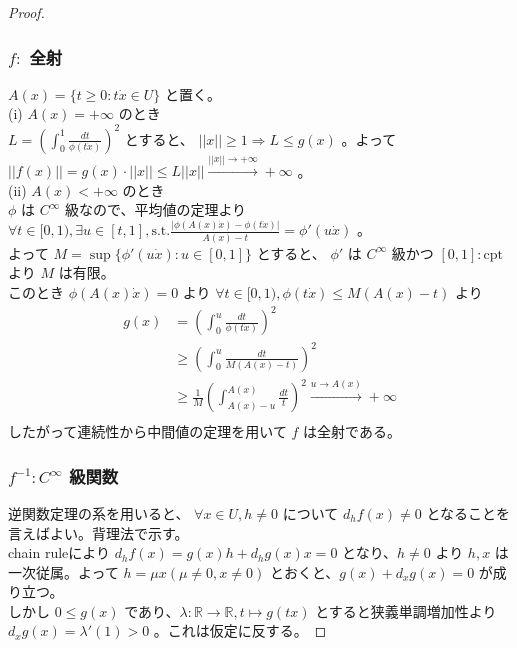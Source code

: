\documentclass[a4paper,10pt]{jsarticle}
\begin{document}
\begin{proof}
  \subsubsection*{$f:$ 全射}
  $A(x)=\{t \geq 0: t\dot{x} \in U\}$ と置く。 \\
  (i) $A(x)=+\infty$ のとき \\
  $L=(\int_{0}^{1} \frac{dt}{\phi(t\dot{x})})^2$ とすると、 $||x|| \geq 1 \Rightarrow L \leq g(x)$ 。よって $||f(x)||=g(x)\cdot ||x|| \leq L||x||\xrightarrow{||x|| \to +\infty} +\infty$ 。
  \\
  (ii) $A(x)<+\infty$ のとき \\
  $\phi$ は $C^\infty$ 級なので、平均値の定理より $\forall t \in [0,1),\exists u \in [t,1],\mbox{s.t.} \frac{|\phi(A(x)\dot{x})-\phi(t\dot{x})|}{A(x)-t}=\phi'(u\dot{x})$ 。 \\
  よって $M=\sup\{\phi'(u\dot{x}):u \in [0,1]\}$ とすると、 $\phi'$ は $C^\infty$ 級かつ $[0,1]:\mbox{cpt}$ より $M$ は有限。 \\
  このとき $\phi(A(x)\dot{x})=0$ より $\forall t \in [0,1),\phi(t\dot{x}) \leq M(A(x)-t)$ より
  \begin{align*}
    g(x) &=(\int_{0}^{u} \frac{dt}{\phi(t\dot{x})})^2 \\
    & \geq (\int_{0}^{u} \frac{dt}{M(A(x)-t)})^2 \\
    & \geq \frac{1}{M} (\int_{A(x)-u}^{A(x)} \frac{dt}{t})^2 \xrightarrow{u \to A(x)} +\infty \\
  \end{align*}
  したがって連続性から中間値の定理を用いて $f$ は全射である。

  \subsubsection*{$f^{-1}:C^\infty$ 級関数}
  逆関数定理の系を用いると、 $\forall x \in U,h \neq 0$ について $d_hf(x) \neq 0$ となることを言えばよい。背理法で示す。 \\
  chain ruleにより $d_hf(x)=g(x)h+d_hg(x)x=0$ となり、$h \neq 0$ より $h,x$ は一次従属。よって $h=\mu x(\mu \neq 0,x \neq 0)$ とおくと、$g(x)+d_xg(x)=0$ が成り立つ。 \\
  しかし $0 \leq g(x)$ であり、$\lambda:\mathbb{R} \to \mathbb{R},t \mapsto g(tx)$ とすると狭義単調増加性より $d_xg(x)=\lambda'(1)>0$ 。これは仮定に反する。
\end{proof}
\end{document}
